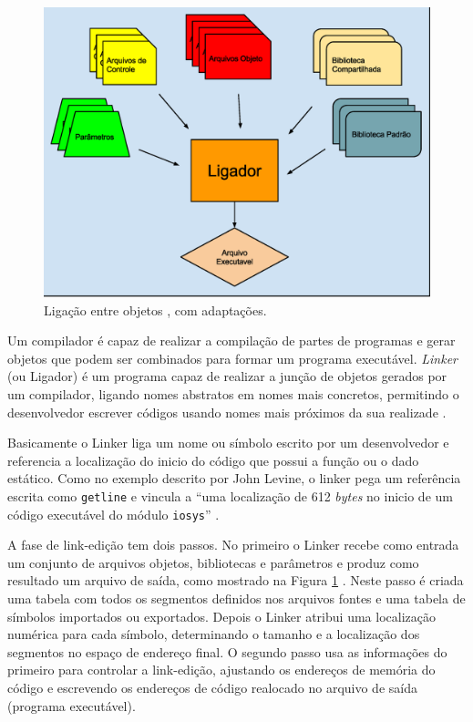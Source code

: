 \begin{figure}[h]
    \centering
        \includegraphics[keepaspectratio=true,scale=0.5]{figuras/ligador.eps}
    \caption{Ligação entre objetos \cite[pág.  7]{ref36}, com adaptações.}
    \label{fig03}
\end{figure}

Um compilador é capaz de realizar a compilação de partes de programas e gerar
 objetos que podem ser combinados para formar um programa executável. 
\textit{Linker} (ou Ligador) é um programa capaz de realizar a junção 
de objetos gerados por um compilador, ligando nomes abstratos em nomes
 mais concretos, permitindo o desenvolvedor escrever códigos usando nomes 
mais próximos da sua realizade \cite{ref36}.


 Basicamente o Linker liga um nome ou símbolo escrito por um desenvolvedor e
 referencia a localização do inicio do código que possui a função ou o dado
 estático. Como no exemplo descrito por John Levine, o linker pega um 
referência escrita como \texttt{getline}  e vincula a “uma localização de 612 \textit{bytes}
no inicio de um código executável do módulo \texttt{iosys}” \cite[pág. 7]{ref36}. 

A fase de link-edição tem dois passos. No primeiro o Linker recebe como 
entrada um conjunto de arquivos objetos, bibliotecas e parâmetros e produz
 como resultado um arquivo de saída, como mostrado na Figura \ref{fig03}
 \cite[pág. 13]{ref36}. Neste passo é criada uma tabela com 
todos os segmentos definidos nos arquivos fontes e uma tabela de símbolos 
importados ou exportados. Depois o Linker atribui uma localização numérica 
para cada símbolo, determinando o tamanho e a localização dos segmentos no
 espaço de endereço final. O segundo passo usa as informações do primeiro
 para controlar a link-edição, ajustando os endereços de memória do código e
 escrevendo os endereços de código realocado no arquivo de saída
 (programa executável).


